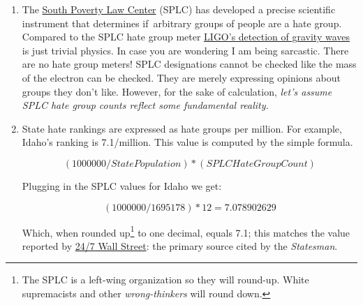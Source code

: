 \begin{enumerate}
\def\labelenumi{\arabic{enumi}.}
\item
  The \href{https://www.splcenter.org/}{South Poverty Law Center} (SPLC)
  has developed a precise scientific instrument that determines
  if~arbitrary groups of people are a hate group. Compared to the SPLC
  hate group meter \href{https://www.ligo.caltech.edu/}{LIGO's detection
  of gravity waves} is just trivial physics. In case you are wondering I
  am being sarcastic. There are no hate group meters! SPLC designations
  cannot be checked like the mass of the electron can be checked. They
  are merely expressing opinions about groups they don't like. However,
  for the sake of calculation, \emph{let's assume SPLC hate group counts
  reflect some fundamental reality.}
\item
  State hate rankings are expressed as hate groups per million. For
  example, Idaho's ranking is 7.1/million. This value is computed by the
  simple formula.

\[(1000000/StatePopulation) * (SPLCHateGroupCount)\]

Plugging in the SPLC values for Idaho we get:

\[(1000000/1695178) * 12 = 7.078902629\]

Which, when rounded up\footnote{The SPLC is a left-wing organization so they will round-up. White
  supremacists and other \emph{wrong-thinkers} will round
  down.
} to
one decimal, equals 7.1; this matches the value reported by
\href{http://247wallst.com/special-report/2017/08/14/10-states-with-the-most-hate-groups-3/4/}{24/7
Wall Street}: the primary source cited by the \textit{Statesman}.
\end{enumerate}

